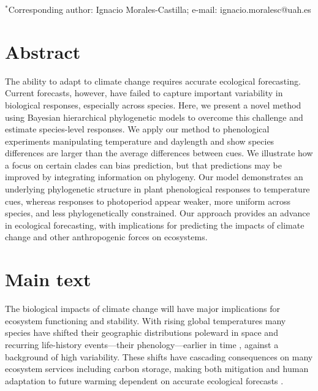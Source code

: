 \documentclass{article}
\begin{document}
\vspace{2ex}
$^*$Corresponding author: Ignacio Morales-Castilla; e-mail: ignacio.moralesc@uah.es\\


\renewcommand{\thetable}{\arabic{table}}
\renewcommand{\thefigure}{\arabic{figure}}
\renewcommand{\labelitemi}{$-$}

\clearpage



\linenumbers
\section*{Abstract} %
The ability to adapt to climate change requires accurate ecological forecasting. Current forecasts, however, have failed to capture important variability in biological responses, especially across species. Here, we present a novel method using Bayesian hierarchical phylogenetic models to overcome this challenge and estimate species-level responses. We apply our method to phenological experiments manipulating temperature and daylength and show species differences are larger than the average differences between cues. We illustrate how a focus on certain clades can bias prediction, but that predictions may be improved by integrating information on phylogeny. Our model demonstrates an underlying phylogenetic structure in plant phenological responses to temperature cues, whereas responses to photoperiod appear weaker, more uniform across species, and less phylogenetically constrained. Our approach provides an advance in ecological forecasting, with implications for predicting the impacts of climate change and other anthropogenic forces on ecosystems.

\clearpage






\section*{Main text}
The biological impacts of climate change will have major implications for ecosystem functioning and stability. With rising global temperatures many species have shifted their geographic distributions poleward in space and recurring life-history events---their phenology---earlier in time \citep{IPCC:2014sm,parmesan2003}, against a background of high variability. These shifts have cascading consequences on many ecosystem services including carbon storage, making both mitigation and human adaptation to future warming dependent on accurate ecological forecasts \citep{richardson2013}. 
\end{document}
